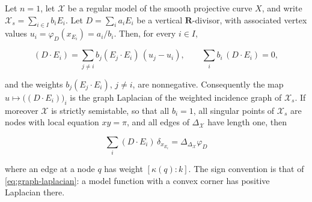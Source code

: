 \begin{proposition}
\label{prop:ch20-curve-laplacian}
Let $n=1$, let $\mathcal X$ be a regular model of the smooth projective
curve $X$, and write $\mathcal X_s=\sum_{i\in I}b_iE_i$.  Let
$D=\sum_ia_iE_i$ be a vertical $\mathbf R$-divisor, with associated
vertex values $u_i=\varphi_D(x_{E_i})=a_i/b_i$.  Then, for every
$i\in I$,

\begin{equation}
\label{eq:ch20-curve-laplacian}
 (D\cdot E_i)=\sum_{j\neq i}b_j(E_j\cdot E_i)\,(u_j-u_i),
 \qquad
 \sum_{i}b_i\,(D\cdot E_i)=0 ,
\end{equation}

and the weights $b_j(E_j\cdot E_i)$, $j\ne i$, are nonnegative.
Consequently the map $u\mapsto\bigl((D\cdot E_i)\bigr)_i$ is the graph
Laplacian of the weighted incidence graph of $\mathcal X_s$.  If moreover
$\mathcal X$ is strictly semistable, so that all $b_i=1$, all singular points of
$\mathcal X_s$ are nodes with local equation $xy=\pi$, and all edges of
$\Delta_{\mathcal X}$ have length one, then

\begin{equation}
\label{eq:ch20-curve-laplacian-graph}
 \sum_{i}(D\cdot E_i)\,\delta_{x_{E_i}}
 =\Delta_{\Delta_{\mathcal X}}\varphi_D
\end{equation}

where an edge at a node $q$ has weight $[\kappa(q):k]$.
The sign convention is that of \eqref{eq:graph-laplacian}:
a model function with a convex corner has positive Laplacian there.
\end{proposition}

